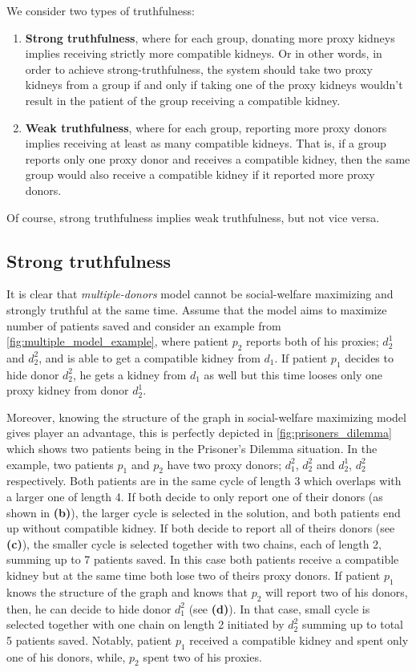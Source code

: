We consider two types of truthfulness:
\begin{enumerate}
    \item \textbf{Strong truthfulness}, where for each group, donating more proxy kidneys implies receiving strictly more compatible kidneys. Or in other words, in order to achieve strong-truthfulness, the system should take two proxy kidneys from a group if and only if taking one of the proxy kidneys wouldn't result in the patient of the group receiving a compatible kidney.
    \item \textbf{Weak truthfulness}, where for each group, reporting more proxy donors implies receiving at least as many compatible kidneys. That is, if a group reports only one proxy donor and receives a compatible kidney, then the same group would also receive a compatible kidney if it reported more proxy donors.
\end{enumerate}
Of course, strong truthfulness implies weak truthfulness, but not vice versa.

\subsection{Strong truthfulness}

It is clear that \textit{multiple-donors} model cannot be social-welfare maximizing and strongly truthful at the same time. Assume that the model aims to maximize number of patients saved and consider an example from \autoref{fig:multiple_model_example}, where patient $p_2$ reports both of his proxies; $d_2^1$ and $d_2^2$, and is able to get a compatible kidney from $d_1$. If patient $p_1$ decides to hide donor $d_2^2$, he gets a kidney from $d_1$ as well but this time looses only one proxy kidney from donor $d_2^1$.

Moreover, knowing the structure of the graph in social-welfare maximizing model gives player an advantage, this is perfectly depicted in \autoref{fig:prisoners_dilemma} which shows two patients being in the Prisoner's Dilemma situation. In the example, two patients $p_1$ and $p_2$ have two proxy donors; $d_1^2$, $d_2^2$ and $d_2^1$, $d_2^2$ respectively. Both patients are in the same cycle of length 3 which overlaps with a larger one of length 4. If both decide to only report one of their donors (as shown in \textbf{(b)}), the larger cycle is selected in the solution, and both patients end up without compatible kidney. If both decide to report all of theirs donors (see \textbf{(c)}), the smaller cycle is selected together with two chains, each of length 2, summing up to 7 patients saved. In this case both patients receive a compatible kidney but at the same time both lose two of theirs proxy donors. If patient $p_1$ knows the structure of the graph and knows that $p_2$ will report two of his donors, then, he can decide to hide donor $d_1^2$ (see \textbf{(d)}). In that case, small cycle is selected together with one chain on length 2 initiated by $d_2^2$ summing up to total 5 patients saved. Notably, patient $p_1$ received a compatible kidney and spent only one of his donors, while, $p_2$ spent two of his proxies.



